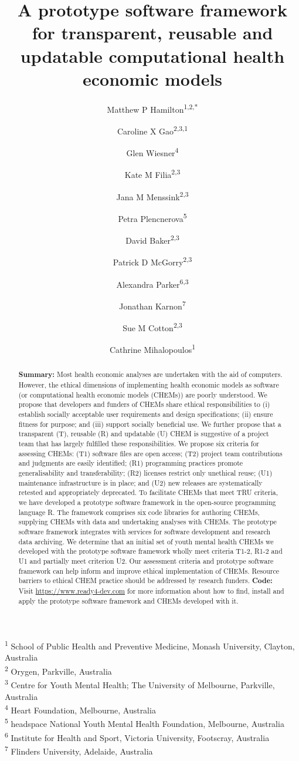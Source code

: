 \documentclass[
]{article}
\title{A prototype software framework for transparent, reusable and updatable computational health economic models}
\author{Matthew P Hamilton\textsuperscript{1,2,*} \and Caroline X Gao\textsuperscript{2,3,1} \and Glen Wiesner\textsuperscript{4} \and Kate M Filia\textsuperscript{2,3} \and Jana M Menssink\textsuperscript{2,3} \and Petra Plencnerova\textsuperscript{5} \and David Baker\textsuperscript{2,3} \and Patrick D McGorry\textsuperscript{2,3} \and Alexandra Parker\textsuperscript{6,3} \and Jonathan Karnon\textsuperscript{7} \and Sue M Cotton\textsuperscript{2,3} \and Cathrine Mihalopoulos\textsuperscript{1}}
\date{}
\begin{document}
\maketitle
\begin{abstract}
\textbf{Summary: } Most health economic analyses are undertaken with the aid of computers. However, the ethical dimensions of implementing health economic models as software (or computational health economic models (CHEMs)) are poorly understood. We propose that developers and funders of CHEMs share ethical responsibilities to (i) establish socially acceptable user requirements and design specifications; (ii) ensure fitness for purpose; and (iii) support socially beneficial use. We further propose that a transparent (T), reusable (R) and updatable (U) CHEM is suggestive of a project team that has largely fulfilled these responsibilities. We propose six criteria for assessing CHEMs: (T1) software files are open access; (T2) project team contributions and judgments are easily identified; (R1) programming practices promote generalisability and transferability; (R2) licenses restrict only unethical reuse; (U1) maintenance infrastructure is in place; and (U2) new releases are systematically retested and appropriately deprecated. To facilitate CHEMs that meet TRU criteria, we have developed a prototype software framework in the open-source programming language R. The framework comprises six code libraries for authoring CHEMs, supplying CHEMs with data and undertaking analyses with CHEMs. The prototype software framework integrates with services for software development and research data archiving. We determine that an initial set of youth mental health CHEMs we developed with the prototype software framework wholly meet criteria T1-2, R1-2 and U1 and partially meet criterion U2. Our assessment criteria and prototype software framework can help inform and improve ethical implementation of CHEMs. Resource barriers to ethical CHEM practice should be addressed by research funders. \newline \newline \textbf{Code: } Visit \url{https://www.ready4-dev.com} for more information about how to find, install and apply the prototype software framework and CHEMs developed with it. \newline \newline
\end{abstract}

\textsuperscript{1} School of Public Health and Preventive Medicine, Monash University, Clayton, Australia\\
\textsuperscript{2} Orygen, Parkville, Australia\\
\textsuperscript{3} Centre for Youth Mental Health; The University of Melbourne, Parkville, Australia\\
\textsuperscript{4} Heart Foundation, Melbourne, Australia\\
\textsuperscript{5} headspace National Youth Mental Health Foundation, Melbourne, Australia\\
\textsuperscript{6} Institute for Health and Sport, Victoria University, Footscray, Australia\\
\textsuperscript{7} Flinders University, Adelaide, Australia
\end{document}
